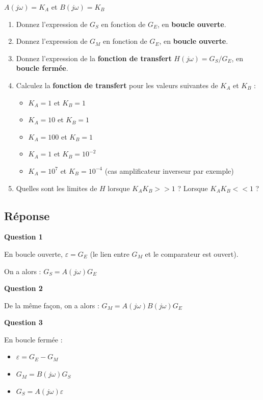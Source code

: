 \documentclass[a4paper,11pt,twoside]{book} %
\begin{document}
$A(j \omega) = K_A$ et $B(j \omega) = K_B$


\begin{enumerate}
	\item Donnez l'expression de $G_S$ en fonction de $G_E$, en \textbf{boucle ouverte}.
	\item Donnez l'expression de $G_M$ en fonction de $G_E$, en \textbf{boucle ouverte}.
		
	\item Donnez l'expression de la \textbf{fonction de transfert} $H(j \omega) = G_S / G_E$, en \textbf{boucle fermée}.
	\item Calculez la \textbf{fonction de transfert} pour les valeurs suivantes de $K_A$ et $K_B$ :
	\begin{itemize}
		\item $K_A = 1$ et $K_B = 1$
		\item $K_A = 10$ et $K_B = 1$
		\item $K_A = 100$ et $K_B = 1$
		\item $K_A = 1$ et $K_B = 10^{-2}$
		\item $K_A = 10^7$ et $K_B = 10^{-4}$ (cas amplificateur inverseur par exemple)
	\end{itemize}
	\item Quelles sont les limites de $H$ lorsque $K_A K_B >> 1$ ? Lorsque $K_A K_B << 1$ ?
\end{enumerate}


\subsection*{Réponse}

\textbf{Question 1}

En boucle ouverte, $\varepsilon = G_E$ (le lien entre $G_M$ et le comparateur est ouvert).

On a alors : $\boxed{G_S = A(j \omega) G_E}$

\noindent\hrulefill

\medskip
\textbf{Question 2}

De la même façon, on a alors : $\boxed{G_M = A(j \omega) B(j \omega) G_E}$


\newpage
\medskip
\textbf{Question 3}

En boucle fermée : 

\begin{itemize}
	\item $\varepsilon = G_E - G_M$
	\item $G_M = B(j \omega) G_S$
	\item $G_S = A(j \omega) \varepsilon$
\end{itemize}
\end{document}
